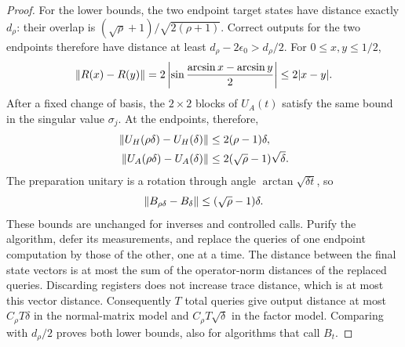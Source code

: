 \begin{proof}
For the lower bounds, the two endpoint target states have distance exactly $d_\rho$: their overlap is $(\sqrt\rho+1)/\sqrt{2(\rho+1)}$. Correct outputs for the two endpoints therefore have distance at least $d_\rho-2\epsilon_0>d_\rho/2$.
For $0\leq x,y\leq1/2$,
\[
 \left\lVert R(x)-R(y)\right\rVert
 =2\left|\sin\frac{\arcsin x-\arcsin y}{2}\right|
 \leq2|x-y|.
\]
After a fixed change of basis, the $2\times2$ blocks of $U_A(t)$ satisfy the same bound in the singular value $\sigma_j$. At the endpoints, therefore,
\begin{align*}
 \left\lVert U_H(\rho\delta)-U_H(\delta)\right\rVert&\leq2(\rho-1)\delta,\\
 \left\lVert U_A(\rho\delta)-U_A(\delta)\right\rVert&\leq2(\sqrt\rho-1)\sqrt\delta.
\end{align*}
The preparation unitary is a rotation through angle $\arctan\sqrt{\delta t}$, so
\[
 \left\lVert B_{\rho\delta}-B_\delta\right\rVert
 \leq(\sqrt\rho-1)\delta.
\]
These bounds are unchanged for inverses and controlled calls. Purify the algorithm, defer its measurements, and replace the queries of one endpoint computation by those of the other, one at a time. The distance between the final state vectors is at most the sum of the operator-norm distances of the replaced queries. Discarding registers does not increase trace distance, which is at most this vector distance. Consequently $T$ total queries give output distance at most $C_\rho T\delta$ in the normal-matrix model and $C_\rho T\sqrt\delta$ in the factor model. Comparing with $d_\rho/2$ proves both lower bounds, also for algorithms that call $B_t$.


\end{proof}
